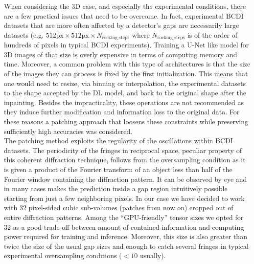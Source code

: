 When considering the 3D case, and especially the experimental conditions, there are a few practical issues that need
to be overcome. In fact, experimental BCDI datasets that are more often affected by a detector's gaps are necessarily large
datasets (e.g. $512\text{px} \times 512\text{px} \times N_{\text{rocking\_steps}}$ where $ N_{\text{rocking\_steps}}$ is of 
the order of hundreds of pixels in typical BCDI experiments). 
Training a U-Net like model for 3D images of that size is 
overly expensive in terms of computing memory and time. Moreover, a common problem with this type of architectures is that
the size of the images they can process is fixed by the first initialization. This means that one would need to resize, via 
binning or interpolation, the experimental datasets to the shape accepted by the DL model, and back to the original
shape after the inpainting. Besides the impracticality, these operations are not recommended as they induce further
modification and information loss to the original data. For these reasons a patching approach that 
loosens these constraints while preserving sufficiently high accuracies was considered. \\

The patching method exploits the regularity of the oscillations within BCDI datasets. The periodicity of the fringes 
in reciprocal space, peculiar property of this coherent diffraction technique, follows from the oversampling condition 
as it is given a product of the Fourier transform 
of an object less than half of the Fourier window containing the diffraction pattern. It can be observed by eye and 
in many cases makes the prediction inside a gap region intuitively possible starting from just a few neighboring pixels. 
In our case we have decided to work with 32 pixel-sided cubic sub-volumes (patches from now on) cropped out of entire diffraction 
patterns. Among the ``GPU-friendly'' tensor sizes \cite{nvidia_tensor_cores_optimization} we opted for 32 as a good trade-off
between amount of contained information and computing power required for training and inference. Moreover, this size is 
also greater than twice the size of the usual gap sizes and enough to catch several fringes in typical experimental 
oversampling conditions ($< 10$ usually). 

